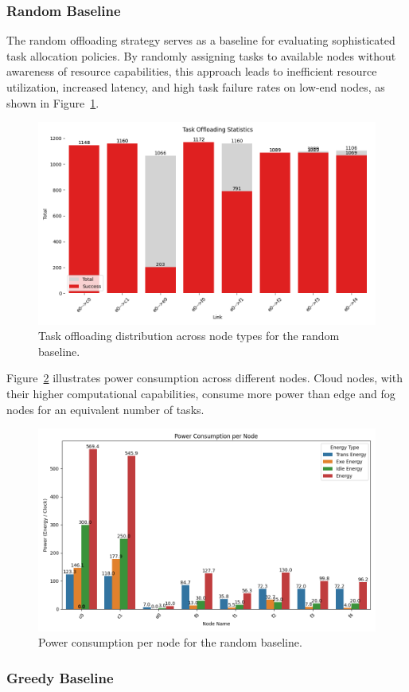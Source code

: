 \documentclass[preprint,3p,authoryear]{elsarticle}
\begin{document}
\subsubsection{Random Baseline}
\label{subsec:random}

The random offloading strategy serves as a baseline for evaluating sophisticated task allocation policies. By randomly assigning tasks to available nodes without awareness of resource capabilities, this approach leads to inefficient resource utilization, increased latency, and high task failure rates on low-end nodes, as shown in Figure~\ref{fig:random-task-offloading-stats}.

\begin{figure}[H]
    \centering
    \includegraphics[width=0.5\linewidth]{figs/Random/task_offloading_statistics.png}
    \caption{Task offloading distribution across node types for the random baseline.}
    \label{fig:random-task-offloading-stats}
\end{figure}

Figure~\ref{fig:random-power-consumption} illustrates power consumption across different nodes. Cloud nodes, with their higher computational capabilities, consume more power than edge and fog nodes for an equivalent number of tasks.

\begin{figure}[H]
    \centering
    \includegraphics[width=0.5\linewidth]{figs/Random/power_consumption_per_node.png}
    \caption{Power consumption per node for the random baseline.}
    \label{fig:random-power-consumption}
\end{figure}


\subsubsection{Greedy Baseline}
\label{subsec:greedy-baseline}
\end{document}

